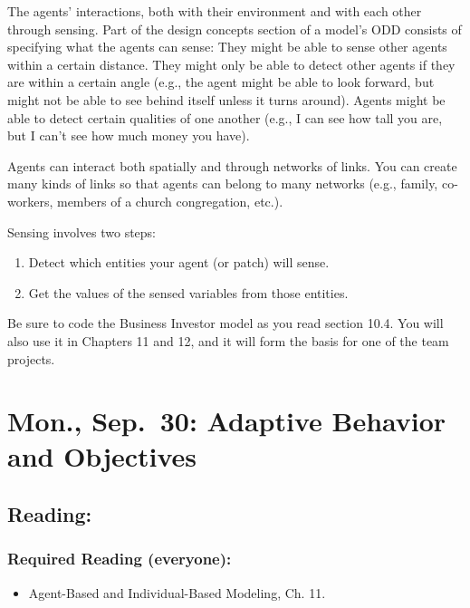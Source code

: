 \documentclass[
]{article}
\providecommand{\tightlist}{%
  \setlength{\itemsep}{0pt}\setlength{\parskip}{0pt}}
\begin{document}
The agents' interactions, both with their environment and with each
other through sensing. Part of the design concepts section of a model's
ODD consists of specifying what the agents can sense: They might be able
to sense other agents within a certain distance. They might only be able
to detect other agents if they are within a certain angle (e.g., the
agent might be able to look forward, but might not be able to see behind
itself unless it turns around). Agents might be able to detect certain
qualities of one another (e.g., I can see how tall you are, but I can't
see how much money you have).

Agents can interact both spatially and through networks of links. You
can create many kinds of links so that agents can belong to many
networks (e.g., family, co-workers, members of a church congregation,
etc.).

Sensing involves two steps:

\begin{enumerate}
\def\labelenumi{\arabic{enumi}.}
\tightlist
\item
  Detect which entities your agent (or patch) will sense.
\item
  Get the values of the sensed variables from those entities.
\end{enumerate}

Be sure to code the Business Investor model as you read section 10.4.
You will also use it in Chapters 11 and 12, and it will form the basis
for one of the team projects.

\section{Mon., Sep.~30: Adaptive Behavior and
Objectives}\label{mon.-sep.-30-adaptive-behavior-and-objectives}

\subsection{Reading:}\label{reading-11}

\subsubsection{Required Reading
(everyone):}\label{required-reading-everyone-10}

\begin{itemize}
\tightlist
\item
  Agent-Based and Individual-Based Modeling, Ch. 11.
\end{itemize}
\end{document}
